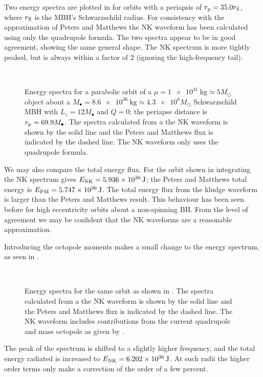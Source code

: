 Two energy spectra are plotted in  for orbits with a periapsis of $r_\mathrm{p} = 35.0 r_\mathrm{S}$, where $r_\mathrm{S}$ is the MBH's Schwarzschild radius. For consistency with the approximation of Peters and Matthews the NK waveform has been calculated using only the quadrupole formula.
The two spectra appear to be in good agreement, showing the same general shape. The NK spectrum is more tightly peaked, but is always within a factor of $2$ (ignoring the high-frequency tail).
\begin{figure}[htbp]
  \begin{center}
    \\
    \caption{Energy spectra for a parabolic orbit of a $\mu = \SI{1e31}{\kg} \simeq 5 M_\odot$ object about a $M_\bullet = \SI{8.6e36}{\kg} \simeq \num{4.3e6} M_\odot$ Schwarzschild MBH with $L_z = 12 M_\bullet$ and $Q = 0$; the periapse distance is $r_\mathrm{p} = 69.9 M_\bullet$. The spectra calculated from a the NK waveform is shown by the solid line and the Peters and Matthews flux is indicated by the dashed line. The NK waveform only uses the quadrupole formula.}
    \label{fig:Energy}
  \end{center}
\end{figure}

We may also compare the total energy flux. For the orbit shown in  integrating the NK spectrum gives $E_\mathrm{NK} = \SI{5.936e36}{\joule}$; the Peters and Matthews total energy is $E_\mathrm{PM} = \SI{5.747e36}{\joule}$. The total energy flux from the kludge waveform is larger than the Peters and Matthews result. This behaviour has been seen before for high eccentricity orbits about a non-spinning BH\cite{Gair2005}. From the level of agreement we may be confident that the NK waveforms are a reasonable approximation.

Introducing the octopole moments makes a small change to the energy spectrum, as seen in .
\begin{figure}[htbp]
  \begin{center}
    \\
    \caption{Energy spectra for the same orbit as shown in . The spectra calculated from a the NK waveform is shown by the solid line and the Peters and Matthews flux is indicated by the dashed line. The NK waveform includes contributions from the current quadrupole and mass octopole as given by .}
    \label{fig:Energy_oct}
  \end{center}
\end{figure}
The peak of the spectrum is shifted to a slightly higher frequency, and the total energy radiated is increased to $E_\mathrm{NK} = \SI{6.202e36}{\joule}$. At such radii the higher order terms only make a correction of the order of a few percent.

